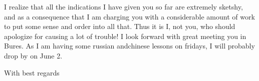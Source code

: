 
I realize that all the indications I have given you so far are extremely sketshy, and as a consequence that I am charging you with a considerable amount of work to put some sense and order into all that. Thus it is I, not you, who should apologize for causing a lot of trouble! I look forward with great  meeting you in Bures. As I am having some russian andchinese lessons on fridays, I will probably drop by on June 2.

With best regards\\

